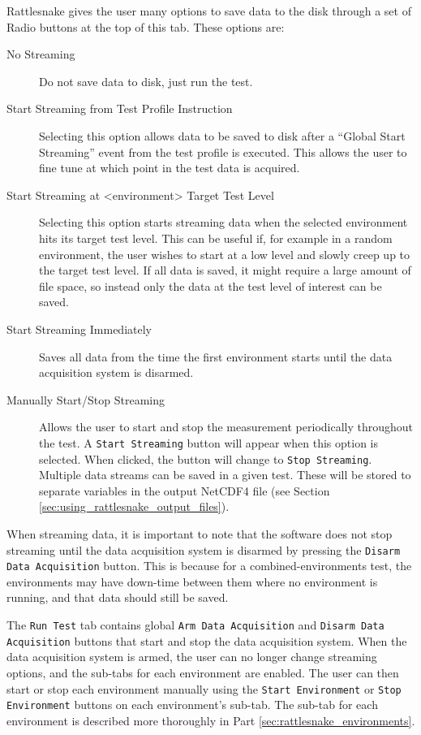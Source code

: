 \documentclass[pdf,12pt,report]{SANDreport}
\newcommand{\inlineCode}{\lstinline[basicstyle=\bfseries\ttfamily]}
\begin{document}
    Rattlesnake gives the user many options to save data to the disk through a set of Radio buttons at the top of this tab.  These options are:
    
    \begin{description}
        \item[No Streaming] Do not save data to disk, just run the test.
        \item[Start Streaming from Test Profile Instruction] Selecting this option allows data to be saved to disk after a ``Global Start Streaming'' event from the test profile is executed.  This allows the user to fine tune at which point in the test data is acquired.
        \item[Start Streaming at <environment> Target Test Level] Selecting this option starts streaming data when the selected environment hits its target test level.  This can be useful if, for example in a random environment, the user wishes to start at a low level and slowly creep up to the target test level.  If all data is saved, it might require a large amount of file space, so instead only the data at the test level of interest can be saved.
        \item[Start Streaming Immediately] Saves all data from the time the first environment starts until the data acquisition system is disarmed.
        \item[Manually Start/Stop Streaming] Allows the user to start and stop the measurement periodically throughout the test.  A \inlineCode{Start Streaming} button will appear when this option is selected.  When clicked, the button will change to \inlineCode{Stop Streaming}.  Multiple data streams can be saved in a given test.  These will be stored to separate variables in the output NetCDF4 file (see Section \ref{sec:using_rattlesnake_output_files}).
    \end{description}

    When streaming data, it is important to note that the software does not stop streaming until the data acquisition system is disarmed by pressing the \inlineCode{Disarm Data Acquisition} button.  This is because for a combined-environments test, the environments may have down-time between them where no environment is running, and that data should still be saved.
    
    The \inlineCode{Run Test} tab contains global \inlineCode{Arm Data Acquisition} and \inlineCode{Disarm Data Acquisition} buttons that start and stop the data acquisition system.  When the data acquisition system is armed, the user can no longer change streaming options, and the sub-tabs for each environment are enabled.  The user can then start or stop each environment manually using the \inlineCode{Start Environment} or \inlineCode{Stop Environment} buttons on each environment's sub-tab.  The sub-tab for each environment is described more thoroughly in Part \ref{sec:rattlesnake_environments}.
    
\end{document}
